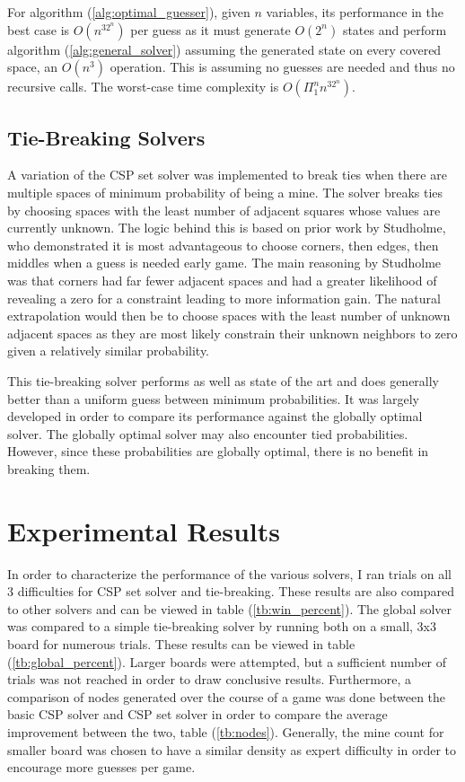 \documentclass[letterpaper]{article}
\begin{document}
For algorithm (\ref{alg:optimal_guesser}), given $n$ variables, its performance in the best case is $O(n^32^n)$ per guess as it must generate $O(2^n)$ states and perform algorithm (\ref{alg:general_solver}) assuming the generated state on every covered space, an $O(n^3)$ operation.  This is assuming no guesses are needed and thus no recursive calls.  The worst-case time complexity is $O(\Pi_1^n n^32^n)$.

\subsection{Tie-Breaking Solvers}
A variation of the CSP set solver was implemented to break ties when there are multiple spaces of minimum probability of being a mine.  The solver breaks ties by choosing spaces with the least number of adjacent squares whose values are currently unknown.  The logic behind this is based on prior work by Studholme, who demonstrated it is most advantageous to choose corners, then edges, then middles when a guess is needed early game.  The main reasoning by Studholme was that corners had far fewer adjacent spaces and had a greater likelihood of revealing a zero for a constraint leading to more information gain.  The natural extrapolation would then be to choose spaces with the least number of unknown adjacent spaces as they are most likely constrain their unknown neighbors to zero given a relatively similar probability.

This tie-breaking solver performs as well as state of the art and does generally better than a uniform guess between minimum probabilities.  It was largely developed in order to compare its performance against the globally optimal solver.  The globally optimal solver may also encounter tied probabilities.  However, since these probabilities are globally optimal, there is no benefit in breaking them.

\section{Experimental Results}
In order to characterize the performance of the various solvers, I ran trials on all 3 difficulties for CSP set solver and tie-breaking.  These results are also compared to other solvers and can be viewed in table (\ref{tb:win_percent}).  The global solver was compared to a simple tie-breaking solver by running both on a small, 3x3 board for numerous trials.  These results can be viewed in table (\ref{tb:global_percent}).  Larger boards were attempted, but a sufficient number of trials was not reached in order to draw conclusive results.  Furthermore, a comparison of nodes generated over the course of a game was done between the basic CSP solver and CSP set solver in order to compare the average improvement between the two, table (\ref{tb:nodes}).  Generally, the mine count for smaller board was chosen to have a similar density as expert difficulty in order to encourage more guesses per game.%
\end{document}
